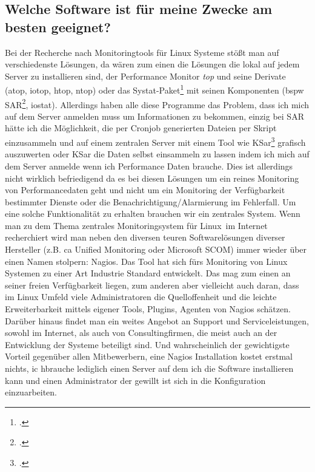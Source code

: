 \documentclass[12pt,a4paper,parskip,listof=totoc,bibliography=totoc]{scrreprt}
\begin{document}
	\subsection{Welche Software ist für meine Zwecke am besten geeignet?}
	Bei der Recherche nach Monitoringtools für Linux Systeme stößt man auf verschiedenste Lösungen, da wären zum einen die Lösungen die lokal auf jedem Server zu installieren sind, der Performance Monitor \textit{top} und seine Derivate (atop, iotop, htop, ntop) oder das Systat-Paket\footcite{sysstat} mit seinen Komponenten (\acrlong{bspw} SAR\footcite{sarkrenn}, iostat). Allerdings haben alle diese Programme das Problem, dass ich mich auf dem Server anmelden muss um Informationen zu bekommen, einzig bei SAR hätte ich die Möglichkeit, die per Cronjob generierten Dateien per Skript einzusammeln und auf einem zentralen Server mit einem Tool wie KSar\footcite{ksar} grafisch auszuwerten oder KSar die Daten selbst einsammeln zu lassen indem ich mich auf dem Server anmelde wenn ich Performance Daten brauche. Dies ist allerdings nicht wirklich befriedigend da es bei diesen Lösungen um ein reines Monitoring von Performancedaten geht und nicht um ein Monitoring der Verfügbarkeit bestimmter Dienste oder die Benachrichtigung/Alarmierung im Fehlerfall. Um eine solche Funktionalität zu erhalten brauchen wir ein zentrales System. 
	Wenn man zu dem Thema \glqq zentrales Monitoringsystem für Linux\grqq\ im Internet recherchiert wird man neben den diversen teuren Softwarelösungen diverser Hersteller (z.B. \acrlong{ca} Unified Monitoring oder Microsoft SCOM) immer wieder über einen Namen stolpern: Nagios. Das Tool hat sich fürs Monitoring von Linux Systemen zu einer Art Industrie Standard entwickelt. Das mag zum einen an seiner freien Verfügbarkeit liegen, zum anderen aber vielleicht auch daran, dass im Linux Umfeld viele Administratoren die Quelloffenheit und die leichte Erweiterbarkeit mittels eigener Tools, Plugins, Agenten von Nagios schätzen. Darüber hinaus findet man ein weites Angebot an Support und Serviceleistungen, sowohl im Internet, als auch von Consultingfirmen, die meist auch an der Entwicklung der Systeme beteiligt sind. Und wahrscheinlich der gewichtigste Vorteil gegenüber allen Mitbewerbern, eine Nagios Installation kostet erstmal nichts, ic hbrauche lediglich einen Server auf dem ich die Software installieren kann und einen Administrator der gewillt ist sich in die Konfiguration einzuarbeiten. 
	
\end{document}
